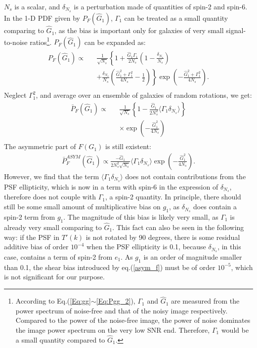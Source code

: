 \documentclass[twocolumn]{aastex62}
\begin{document}
$N_s$ is a scalar, and $\delta_{N_s}$ is a perturbation made of quantities of spin-2 and spin-6. In the 1-D PDF given by $P_F(\hat{G}_1)$, $\Gamma_1$ can be treated as a small quantity comparing to $\hat{G}_1$, as the bias is important only for galaxies of very small signal-to-noise ratios\footnote{According to Eq.(\ref{Eq:gg}$\sim$\ref{Eq:Pgg_2}), $\Gamma_1$ and $\hat{G}_1$ are measured from the power spectrum of noise-free and that of the noisy image respectively. Compared to the power of the noise-free image, the power of noise dominates the image power spectrum on the very low SNR end. Therefore, $\Gamma_1$ would be a small quantity compared to $\hat{G}_1$.}. $P_F(\hat{G}_1)$ can be expanded as:
\begin{eqnarray}
P_F(\hat{G}_1)\propto&&\frac{1}{\sqrt{N_s}}\left\{{1+\frac{\hat{G}_1\Gamma_1}{2N_s}\left(1-\frac{\delta_{N_s}}{N_s}\right)}\right.\\ \nonumber
&&\left.{+\frac{\delta_{N_s}}{N_s}\left(\frac{\hat{G}_1^2+\Gamma_1^2}{4N_s}-\frac{1}{2}\right)}\right\}
\exp\left(-\frac{\hat{G}_1^2+\Gamma_1^2}{4N_s}\right). \\ \nonumber
\end{eqnarray} 
Neglect $\Gamma_1^2$, and average over an ensemble of galaxies of random rotations, we get:
\begin{eqnarray}
\bar{P}_F(\hat{G}_1)\propto&&\frac{1}{\sqrt{N_s}}\left\{1-\frac{\hat{G}_1}{2N_s^2}\langle\Gamma_1\delta_{N_s}\rangle\right\}\\ \nonumber
&&\times\exp\left(-\frac{\hat{G}_1^2}{4N_s}\right) \\ \nonumber
\end{eqnarray} 
The asymmetric part of $F(G_1)$ is still existent:
\begin{eqnarray}
\label{asym_f}
\bar{P}_F^{ASYM}(\hat{G}_1)\propto\frac{-\hat{G}_1}{2N_s^2\sqrt{N_s}}\langle\Gamma_1\delta_{N_s}\rangle\exp\left(-\frac{\hat{G}_1^2}{4N_s}\right).
\end{eqnarray} 
However, we find that the term $\langle\Gamma_1\delta_{N_s}\rangle$ does not contain contributions from the PSF ellipticity, which is now in a term with spin-6 in the expression of $\delta_{N_s}$, therefore does not couple with $\Gamma_1$, a spin-2 quantity. In principle, there should still be some small amount of multiplicative bias on $g_1$, as $\delta_{N_s}$ does contain a spin-2 term from $g_1$. The magnitude of this bias is likely very small, as $\Gamma_1$ is already very small comparing to $\hat{G}_1$. This fact can also be seen in the following way: if the PSF in $T'(k)$ is not rotated by 90 degrees, there is some residual additive bias of order $10^{-4}$ when the PSF ellipticity is 0.1, because $\delta_{N_s}$, in this case, contains a term of spin-2 from $e_1$. As $g_1$ is an order of magnitude smaller than 0.1, the shear bias introduced by eq.(\ref{asym_f}) must be of order $10^{-5}$, which is not significant for our purpose.   
\end{document}
